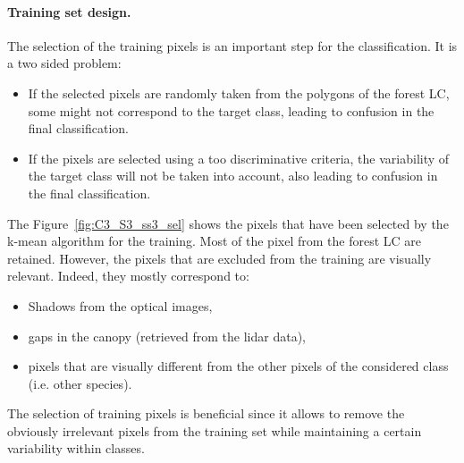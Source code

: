 \paragraph{Training set design. \\}

The selection of the training pixels is an important step for the classification. It is a two sided problem:
\begin{itemize}
\item If the selected pixels are randomly taken from the polygons of the forest LC, some might not correspond to the target class, leading to confusion in the final classification.
\item If the pixels are selected using a too discriminative criteria, the variability of the target class will not be taken into account, also leading to confusion in the final classification.
\end{itemize}

The Figure~\ref{fig:C3_S3_ss3_sel} shows the pixels that have been selected by the k-mean algorithm for the training. Most of the pixel from the forest LC are retained. However, the pixels that are excluded from the training are visually relevant. Indeed, they mostly correspond to:
\begin{itemize}
\item Shadows from the optical images,
\item gaps in the canopy (retrieved from the lidar data),
\item pixels that are visually different from the other pixels of the considered class (i.e. other species).
\end{itemize}

The selection of training pixels is beneficial since it allows to remove the obviously irrelevant pixels from the training set while maintaining a certain variability within classes.

